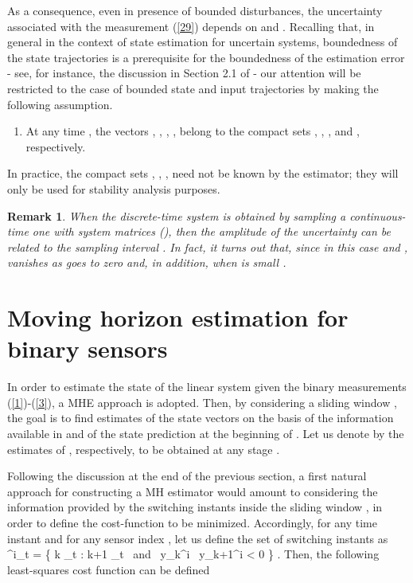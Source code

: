 \documentclass[11pt,journal,onecolumn]{IEEEtran}
\newtheorem{remark}{Remark}
\newcommand{\be}{}
\begin{document}
As a consequence, even in presence of bounded disturbances, the uncertainty associated with the measurement (\ref{29}) depends on  and .
Recalling that, in general in the context of state estimation for uncertain systems, boundedness of the state trajectories is a prerequisite for the boundedness of the estimation error - see, for instance, the discussion in Section 2.1 of \cite{BlMi} - our attention will be restricted to the case of bounded state and input trajectories by making the following assumption. \vspace{.3cm}

\begin{enumerate}[\bf {A}1]
\item At any time , the vectors , , , , belong to the compact sets , , , and , respectively.
\end{enumerate} \vspace{.3cm}

In practice, the compact sets , , ,  need not be known by the estimator; they will only be used for stability analysis purposes.
\begin{remark}
When the discrete-time system is obtained by sampling a continuous-time one with system matrices (), then the amplitude of the uncertainty  can be related to the sampling interval . In fact, it turns out that, since in this case  and ,  vanishes as  goes to zero and, in addition, when  is small
.
\end{remark}

\section{Moving horizon estimation for binary sensors}

In order to estimate the state  of the linear system  given the binary measurements (\ref{1})-(\ref{3}), a MHE approach is adopted. Then, by considering a sliding window , the goal is to find estimates of the state vectors  on the basis of the information available in   and of the state prediction  at the beginning of .  Let us denote by  the estimates of , respectively, to be obtained at any stage .

Following the discussion at the end of the previous section, a first natural approach for constructing a MH estimator would amount to considering the information provided by the switching instants inside the sliding window , in order to define the cost-function to be minimized. Accordingly, for any time instant  and for any sensor index , let us define the set  of switching instants as
\be\label{5}
^{i}_t = \{ k \in {}_t : k+1  \in {}_t \mbox{ and } y_k^i \, y_{k+1}^i < 0 \} .
\ee
Then, the following least-squares cost function can be defined
\end{document}
